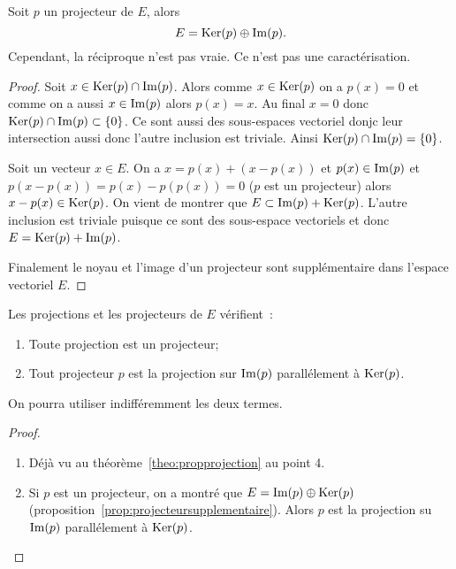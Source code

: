 \begin{prop}\label{prop:projecteursupplementaire}
  Soit $p$ un projecteur de $E$, alors
  \begin{equation}
    E = \operatorname{Ker}(p) \oplus \operatorname{Im}(p).
  \end{equation}
  Cependant, la réciproque n'est pas vraie. Ce n'est pas une caractérisation.
\end{prop}
\begin{proof}
  Soit $x \in \operatorname{Ker}(p) \cap \operatorname{Im}(p)$. Alors comme $x \in \operatorname{Ker}(p)$ on a $p(x)=0$ et comme on a aussi $x \in \operatorname{Im}(p)$ alors $p(x)=x$. Au final $x = 0$ donc $\operatorname{Ker}(p) \cap \operatorname{Im}(p) \subset \{0\}$. Ce sont aussi des sous-espaces vectoriel donjc leur intersection aussi donc l'autre inclusion est triviale. Ainsi $\operatorname{Ker}(p) \cap \operatorname{Im}(p)=\{0\}$.

  Soit un vecteur $x \in E$. On a $x = p(x) +(x-p(x))$ et $p(x) \in \operatorname{Im}(p)$ et $p(x-p(x))=p(x)-p(p(x))=0$ ($p$ est un projecteur) alors $x-p(x) \in \operatorname{Ker}(p)$. On vient de montrer que $E \subset \operatorname{Im}(p) + \operatorname{Ker}(p)$. L'autre inclusion est triviale puisque ce sont des sous-espace vectoriels et donc $E = \operatorname{Ker}(p) +\operatorname{Im}(p)$.

  Finalement le noyau et l'image d'un projecteur sont supplémentaire dans l'espace vectoriel $E$.
\end{proof}

\begin{prop}
Les projections et les projecteurs de $E$ vérifient~:
  \begin{enumerate}
  \item Toute projection est un projecteur;
  \item Tout projecteur $p$ est la projection sur $\operatorname{Im}(p)$ parallélement à $\operatorname{Ker}(p)$.
  \end{enumerate}
  On pourra utiliser indifféremment les deux termes.
\end{prop}
\begin{proof}
  \begin{enumerate}
  \item Déjà vu au théorème~\ref{theo:propprojection} au point 4.
  \item Si $p$ est un projecteur, on a montré que $E = \operatorname{Im}(p) \oplus \operatorname{Ker}(p)$ (proposition~\ref{prop:projecteursupplementaire}). Alors $p$ est la projection su $\operatorname{Im}(p)$ parallélement à $\operatorname{Ker}(p)$.
  \end{enumerate}
\end{proof}

